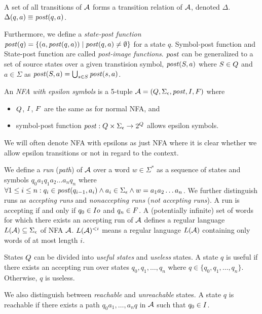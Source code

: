 A set of all transitions of $\mathcal{A}$ forms a transition relation of $\mathcal{A}$, denoted $\Delta$. $\Delta(q, a) \equiv \mathit{post}(q, a)$.

Furthermore, we define a \emph{state-post function} $\mathit{post}(q) = \{ (a, \mathit{post}(q, a)) \mid \mathit{post}(q, a) \neq \emptyset \}$ for a state $q$.
Symbol-post function and State-post function are called \emph{post-image functions}.
$\mathit{post}$ can be generalized to a set of source states over a given transtision symbol, $\mathit{post}(S, a)$ where $S \in Q$ and $a \in \Sigma$ as $\mathit{post}(S, a) = \bigcup_{s \in S} \mathit{post}(s, a)$.


An \emph{NFA with epsilon symbols} is a 5-tuple $\mathcal{A} = (Q, \Sigma_\epsilon, \mathit{post}, I, F)$ where
\begin{itemize}
    \item $Q$, $I$, $F$ are the same as for normal NFA, and
    \item symbol-post function $\mathit{post}: Q \times \Sigma_\epsilon \rightarrow 2^{Q}$ allows epsilon symbols.
\end{itemize}
We will often denote NFA with epsilons as just NFA where it is clear whether we allow epsilon transitions or not in regard to the context.

We define a \emph{run} (\emph{path}) of $\mathcal{A}$ over a word $w \in \Sigma^*$ as a sequence of states and symbols $q_0a_1q_1a_2\ldots a_nq_n$ where $\forall 1 \leq i \leq n: q_i \in \mathit{post}(q_{i-1}, a_i) \land a_i \in \Sigma_\epsilon \land w = a_1a_2\ldots a_n$.
We further distinguish runs as \emph{accepting runs} and \emph{nonaccepting runs} (\emph{not accepting runs}).
A run is accepting if and only if $q_0 \in I  o$ and $q_n \in F$.
A (potentially infinite) set of words for which there exists an accepting run of $\mathcal{A}$ defines a regular language $L(\mathcal{A}) \subseteq \Sigma_\epsilon$ of NFA $\mathcal{A}$. $L(\mathcal{A})^{<i}$ means a regular language $L(\mathcal{A})$ containing only words of at most length $i$.

States $Q$ can be divided into \emph{useful states} and \emph{useless} states.
A state $q$ is useful if there exists an accepting run over states $q_0, q_1, \ldots, q_n$ where $q \in \{ q_0, q_1, \ldots, q_n \}$.
Otherwise, $q$ is useless.

We also distinguish between \emph{reachable} and \emph{unreachable} states.
A state $q$ is reachable if there exists a path $q_0a_1, \ldots, a_nq$ in $\mathcal{A}$ such that $q_0 \in I$.

